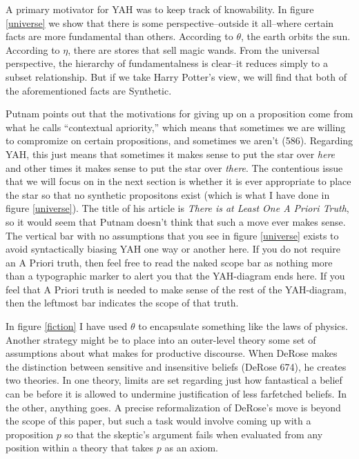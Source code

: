 \documentclass[12pt]{article}
\begin{document}
\begin{flushleft}
A primary motivator for YAH was to keep track of knowability.
In figure \ref{universe} we show that there is some perspective--outside it all--where certain facts are more fundamental than others.
According to $\theta$, the earth orbits the sun.
According to $\eta$, there are stores that sell magic wands.
From the universal perspective, the hierarchy of fundamentalness is clear--it reduces simply to a subset relationship.
But if we take Harry Potter's view, we will find that both of the aforementioned facts are Synthetic.

Putnam points out that the motivations for giving up on a proposition come from what he calls ``contextual apriority,'' which means that sometimes we are willing to compromize on certain propositions, and sometimes we aren't (586).
Regarding YAH, this just means that sometimes it makes sense to put the star over \textit{here} and other times it makes sense to put the star over \textit{there}.
The contentious issue that we will focus on in the next section is whether it is ever appropriate to place the star so that no synthetic propositons exist (which is what I have done in figure \ref{universe}).
The title of his article is \textit{There is at Least One A Priori Truth}, so it would seem that Putnam doesn't think that such a move ever makes sense.
The vertical bar with no assumptions that you see in figure \ref{universe} exists to avoid syntactically biasing YAH one way or another here.
If you do not require an A Priori truth, then feel free to read the naked scope bar as nothing more than a typographic marker to alert you that the YAH-diagram ends here.
If you feel that A Priori truth is needed to make sense of the rest of the YAH-diagram, then the leftmost bar indicates the scope of that truth.

In figure \ref{fiction} I have used $\theta$ to encapsulate something like the laws of physics.
Another strategy might be to place into an outer-level theory some set of assumptions about what makes for productive discourse.
When DeRose makes the distinction between sensitive and insensitive beliefs (DeRose 674), he creates two theories.
In one theory, limits are set regarding just how fantastical a belief can be before it is allowed to undermine justification of less farfetched beliefs.
In the other, anything goes.
A precise reformalization of DeRose's move is beyond the scope of this paper, but such a task would involve coming up with a proposition $p$ so that the skeptic's argument fails when evaluated from any position within a theory that takes $p$ as an axiom.


\end{flushleft}
\end{document}
